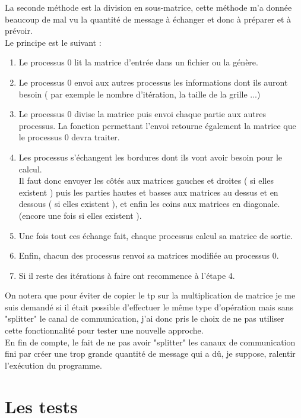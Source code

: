 \documentclass[10pt,a4paper]{article}
\begin{document}
La seconde méthode est la division en sous-matrice, cette méthode m'a donnée beaucoup de mal vu la quantité de message à échanger et donc à préparer et à prévoir. \\
Le principe est le suivant : \\
\begin{enumerate}[(1)]
  \item Le processus 0 lit la matrice d'entrée dans un fichier ou la génère.
  \item Le processus 0 envoi aux autres processus les informations dont ils auront besoin ( par exemple le nombre d'itération, la taille de la grille ...)
  \item Le processus 0 divise la matrice puis envoi chaque partie aux autres processus. La fonction permettant l'envoi retourne également la matrice que le processus 0 devra traiter.
  \item Les processus s'échangent les bordures dont ils vont avoir besoin pour le calcul. \\
  Il faut donc envoyer les côtés aux matrices gauches et droites ( si elles existent ) puis les parties hautes et basses aux matrices au dessus et en dessous ( si elles existent ), et enfin les coins aux matrices en diagonale. (encore une fois si elles existent ).
  \item Une fois tout ces échange fait, chaque processus calcul sa matrice de sortie.
  \item Enfin, chacun des processus renvoi sa matrices modifiée au processus 0.
  \item Si il reste des itérations à faire ont recommence à l'étape 4.

\end{enumerate}
  
On notera que pour éviter de copier le tp sur la multiplication de matrice je me suis demandé si il était possible d'effectuer le même type d'opération mais sans "splitter" le canal de communication, j'ai donc pris le choix de ne pas utiliser cette fonctionnalité pour tester une nouvelle approche. \\
En fin de compte, le fait de ne pas avoir "splitter" les canaux de communication fini par créer une trop grande quantité de message qui a dû, je suppose, ralentir l'exécution du programme.


\section{Les tests}
\end{document}
